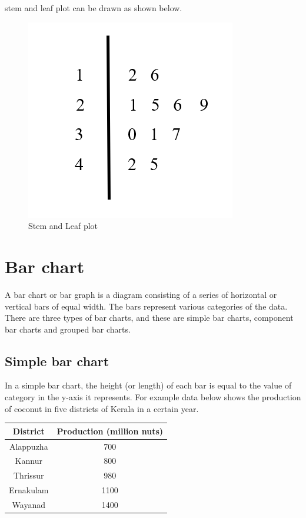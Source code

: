 \documentclass[
]{book}
\begin{document}
stem and leaf plot can be drawn as shown below.

\begin{figure}

{\centering \includegraphics[width=0.5\linewidth]{images/stem} 

}

\caption{Stem and Leaf plot}\label{fig:stem}
\end{figure}

\section{Bar chart}\label{bar-chart}

A bar chart or bar graph is a diagram consisting of a series of
horizontal or vertical bars of equal width. The bars represent various
categories of the data. There are three types of bar charts, and these
are simple bar charts, component bar charts and grouped bar charts.

\subsection{Simple bar chart}\label{simple-bar-chart}

In a simple bar chart, the height (or length) of each bar is equal to
the value of category in the y-axis it represents. For example data
below shows the production of coconut in five districts of Kerala in a
certain year.

\begin{longtable}[]{@{}cc@{}}
\toprule\noalign{}
District & Production (million nuts) \\
\midrule\noalign{}
\endhead
\bottomrule\noalign{}
\endlastfoot
Alappuzha & 700 \\
Kannur & 800 \\
Thrissur & 980 \\
Ernakulam & 1100 \\
Wayanad & 1400 \\
\end{longtable}
\end{document}
